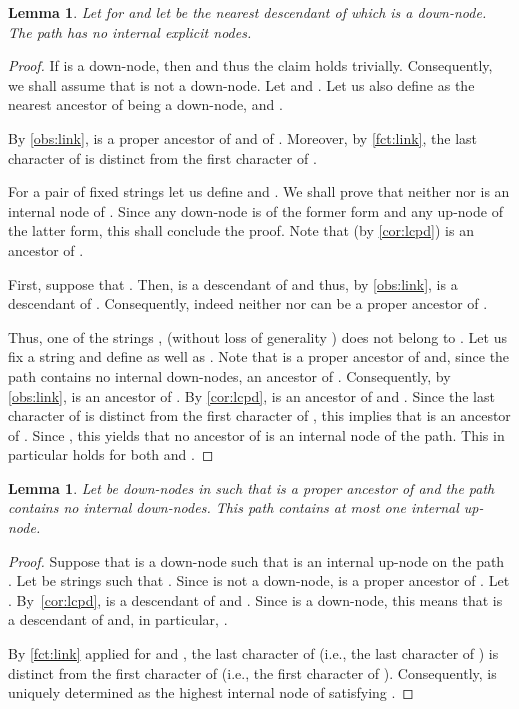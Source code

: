 \documentclass[a4paper]{article}
\newtheorem{lemma}[theorem]{Lemma}
\theoremstyle{remark}
\begin{document}
\begin{lemma}\label{lem:nodown}
Let  for  and let  be the nearest descendant of 
which is a down-node.
The path  has no internal explicit nodes.
\end{lemma}
\begin{proof}
If  is a down-node, then  and thus the claim holds trivially.
Consequently, we shall assume that  is not a down-node.
Let  and .
Let us also define  as the nearest ancestor of  being a down-node,
and .

By \cref{obs:link},  is a proper ancestor of  and  of .
Moreover, by \cref{fct:link}, the last character of  is distinct from the first character of .

For a pair of fixed strings  let us define  and
.
We shall prove that neither  nor  is an internal node of .
Since any down-node is of the former form and any up-node of the latter form, this shall conclude the proof.
Note that (by \cref{cor:lcpd})  is an ancestor of .

First, suppose that . Then, 
is a descendant of  and thus, by \cref{obs:link},  is a descendant of .
Consequently, indeed neither  nor  can be a proper ancestor of .

Thus, one of the strings ,  (without loss of generality ) does not belong to .
Let us fix a string  and define  as well as .
Note that  is a proper ancestor of  and, since the path  contains no internal down-nodes,
an ancestor of . Consequently, by \cref{obs:link},  is an ancestor of .
By \cref{cor:lcpd},  is an ancestor of  and .
Since the last character of  is distinct from the first character of ,
this implies that  is an ancestor of . Since , this yields
that no ancestor of  is an internal node of the  path.
This in particular holds for both  and .
\end{proof}


\begin{lemma}\label{lem:oneup}
Let  be down-nodes in  such that  is a proper ancestor of 
and the path  contains no internal down-nodes.
This path contains at most one internal up-node.
\end{lemma}
\begin{proof}
Suppose that  is a down-node such that 
is an internal up-node on the path .
Let  be strings such that .
Since  is not a down-node,  is a proper ancestor of .
Let . By~\cref{cor:lcpd},
 is a descendant of  and .
Since  is a down-node, this means that  is a descendant of 
and, in particular, .

By \cref{fct:link} applied for  and , the last character of 
(i.e., the last character of )
is distinct from the first character of  (i.e., the first character of ).
Consequently,  is uniquely determined as the highest internal node of 
satisfying .
\end{proof}
\end{document}

